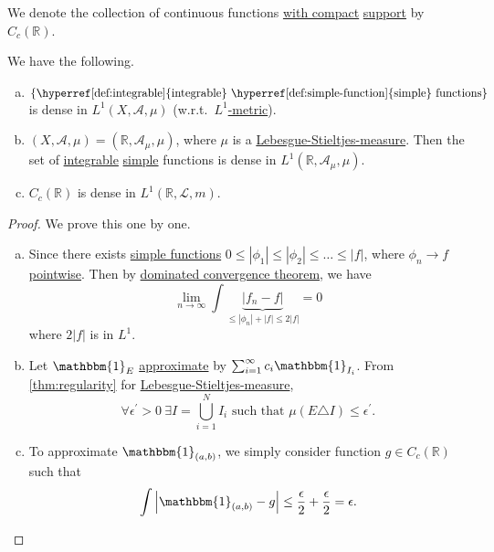 \begin{notation}
	We denote the collection of continuous functions \underline{with compact} \hyperref[def:support]{support} by \(C_c(\mathbb{R} )\).
\end{notation}

\begin{theorem}
	We have the following.
	\begin{enumerate}[(a)]
		\item \(\{\text{\hyperref[def:integrable]{integrable} \hyperref[def:simple-function]{simple} functions} \}\) is dense in \(L^1(X, \mathcal{A} , \mu )\) (w.r.t.\ \hyperref[def:L-1-metric]{\(L^1\)-metric}).
		\item \((X, \mathcal{A} , \mu ) = (\mathbb{R} , \mathcal{A} _\mu , \mu )\), where \(\mu\) is a \hyperref[def:Lebesgue-Stieltjes-measure]{Lebesgue-Stieltjes-measure}. Then the set of \hyperref[def:integrable]{integrable} \hyperref[def:simple-function]{simple} functions is dense in \(L^1(\mathbb{R} , \mathcal{A} _\mu , \mu )\).
		\item \(C_c(\mathbb{R} )\) is dense in \(L^1(\mathbb{R} , \hyperref[def:Lebesgue-measure]{\mathcal{L} , m})\).
	\end{enumerate}
\end{theorem}
\begin{proof}
	We prove this one by one.
	\begin{enumerate}[(a)]
		\item Since there exists \hyperref[def:simple-function]{simple functions} \(0\leq \left\vert \phi _1 \right\vert \leq \left\vert \phi _2 \right\vert\leq \dots \leq \left\vert f \right\vert  \), where \(\phi _{n}\to f\) \hyperref[def:pointwise-convergence]{pointwise}. Then by \hyperref[thm:DCT]{dominated convergence theorem}, we have
		      \[
			      \lim_{n \to \infty} \int \underbrace{\left\vert f_{n} - f\right\vert }_{\leq \left\vert \phi _{n} \right\vert + \left\vert f  \right\vert\leq 2\left\vert f \right\vert } = 0
		      \]
		      where \(2\left\vert f \right\vert \) is in \(L^1\).
		\item Let \(\mathbbm{1}_{E} \) \underline{approximate} by \(\sum_{i=1}^{\infty} c_{i}\mathbbm{1}_{I_{i}} \). From \autoref{thm:regularity} for \hyperref[def:Lebesgue-Stieltjes-measure]{Lebesgue-Stieltjes-measure},
		      \[
			      \forall \epsilon ^\prime >0\ \exists I = \bigcup_{i=1}^{N} I_{i}\text{ such that } \mu (E\triangle I)\leq \epsilon ^\prime .
		      \]
		\item To approximate \(\mathbbm{1}_{(a, b)} \), we simply consider function \(g\in C_c(\mathbb{R} )\) such that
		      \[
			      \int \left\vert \mathbbm{1}_{(a, b)} - g \right\vert \leq \frac{\epsilon}{2} + \frac{\epsilon}{2} = \epsilon .
		      \]
	\end{enumerate}
\end{proof}